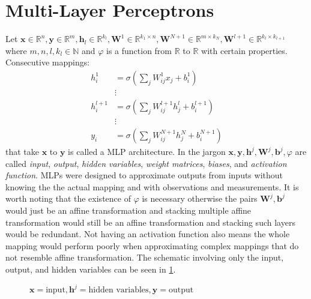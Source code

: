 \section{Multi-Layer Perceptrons}
Let $\boldsymbol{x} \in \mathbb{R}^n,\boldsymbol{y} \in \mathbb{R}^m, \boldsymbol{h}_l \in \mathbb{R}^{k_l}, \boldsymbol{W}^1 \in \mathbb{R}^{k_1 \times n}
,\boldsymbol{W}^{N+1} \in \mathbb{R}^{m \times k_N},\boldsymbol{W}^{l+1} \in \mathbb{R}^{k_l \times k_{l+1}}$ where $m,n,l,k_l \in \mathbb{N}$ and $\varphi$ is a
function from $\mathbb{R}$ to $\mathbb{R}$ with certain properties. 
Consecutive mappings:
\begin{equation}
  \begin{split}
    h_i^{1}   &= \sigma \left( \sum_{j}^{} W_{ij}^{1}x_j + b_i^{1} \right)\\ 
              & \vdots\\
    h_i^{l+1} &= \sigma \left( \sum_{j}^{} W_{ij}^{l+1}h_j^l + b_i^{l+1} \right)\\
              & \vdots\\
    y_i^{}    &= \sigma \left( \sum_{j}^{} W_{ij}^{N+1}h_j^N + b_i^{N+1} \right)
  \end{split}
  \end{equation}
that take $\boldsymbol{x}$ to $\boldsymbol{y}$ is called a \ac{MLP} architecture.
In the \ml jargon $\boldsymbol{x},\boldsymbol{y},\boldsymbol{h}^j,\boldsymbol{W}^j,\boldsymbol{b}^j,\varphi$ are called \emph{input}, \emph{output}, \emph{hidden variables},
\emph{weight matrices}, \emph{biases}, and \emph{activation function}. \ac{MLP}s were designed to approximate outputs from inputs without knowing the the actual mapping and with observations and measurements. 
It is worth noting that the existence of $\varphi$ is necessary otherwise the pairs $\boldsymbol{W}^j,\boldsymbol{b}^j$ would 
just be an affine transformation and stacking multiple affine transformation would still be an affine transformation and stacking 
such layers would be redundant. Not having an activation function also means the whole mapping would perform poorly when approximating 
complex mappings that do not resemble affine transformation. The schematic involving only the input, output, and hidden variables can be seen 
in \cref{fig:multi_layer_perceptron}.
\begin{figure}
  \centering
  \resizebox{1.0\textwidth}{!}{}
  \caption{$\boldsymbol{x} =\text{input},\boldsymbol{h}^j=\text{hidden variables},\boldsymbol{y}=\text{output}$}
  \label{fig:multi_layer_perceptron}
\end{figure}
